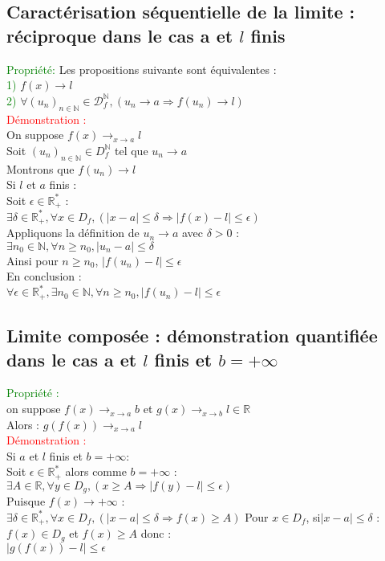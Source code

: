 \documentclass{article}
\begin{document}
\subsection{Caractérisation séquentielle de la limite : réciproque dans le cas a et $l$ finis}
\textcolor{green}{Propriété:} Les propositions suivante sont équivalentes : \\ 
\textcolor{green}{1)} $f(x) \rightarrow l$ \\ 
\textcolor{green}{2)} $\forall (u_n)_{n \in \mathbb{N}} \in \mathcal{D}^\mathbb{N}_f,(u_n \rightarrow a \Rightarrow f(u_n) \rightarrow l)$ \\ 
\textcolor{red}{Démonstration :} \\  
On suppose $f(x) \rightarrow_{x\rightarrow a} l$ \\ 
Soit $(u_n)_{n \in \mathbb{N}}\in D_f^\mathbb{N}$ tel que $u_n \rightarrow a$ \\ 
Montrons que $f(u_n) \rightarrow l$ \\ 
Si $l$ et $a$ finis : \\ 
Soit $\epsilon \in \mathbb{R^*_+}$ : \\ 
$\exists \delta \in \mathbb{R}^*_+, \forall x \in D_f,(|x-a|\leq \delta \Rightarrow |f(x)-l|\leq \epsilon)$ \\ 
Appliquons la définition de $u_n \rightarrow a$ avec $\delta > 0$ : \\ 
$\exists n_0 \in \mathbb{N}, \forall n \geq n_0, |u_n-a| \leq \delta$ \\ 
Ainsi pour $n \geq n_0$, $|f(u_n)-l| \leq \epsilon$ \\ 
En conclusion : \\ 
$\forall  \epsilon \in \mathbb{R}^*_+,\exists n_0 \in \mathbb{N}, \forall n \geq n_0, |f(u_n)-l| \leq \epsilon$
\subsection{Limite composée : démonstration quantifiée dans le cas a et $l$ finis et $b=+\infty$}
\textcolor{green}{Propriété :}\\ 
on suppose $f(x) \rightarrow_{x\rightarrow a} b$ et $g(x) \rightarrow_{x \rightarrow b} l \in \mathbb{R}$ \\ 
Alors : $g(f(x))\rightarrow_{x\rightarrow a} l$ \\ 
\textcolor{red}{Démonstration :} \\ 
Si $a$ et $l$ finis et $b=+ \infty$: \\
Soit $\epsilon \in \mathbb{R}^*_+$ alors comme $b=+ \infty$ : \\ 
$\exists A \in \mathbb{R}, \forall y \in D_g,(x\geq A \Rightarrow |f(y)-l|\leq \epsilon)$ \\
Puisque $f(x) \rightarrow + \infty$ : \\ 
$\exists \delta \in \mathbb{R}^*_+, \forall x \in D_f,(|x-a|\leq \delta \Rightarrow f(x)\geq A)$
Pour $x \in D_f$, si$|x-a| \leq \delta$ : \\ 
$f(x) \in  D_g$ et $f(x) \geq A$ donc : \\ 
$|g(f(x))-l|\leq \epsilon$
\end{document}
